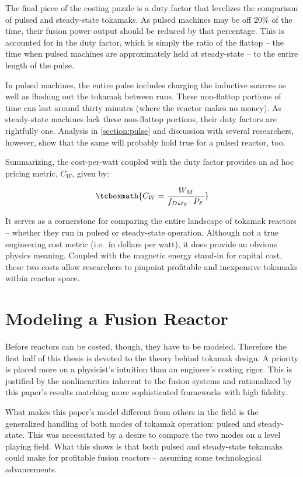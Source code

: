 The final piece of the costing puzzle is a duty factor that levelizes the comparison of pulsed and steady-state tokamaks. As pulsed machines may be off 20\% of the time, their fusion power output should be reduced by that percentage. This is accounted for in the duty factor, which is simply the ratio of the flattop -- the time when pulsed machines are approximately held at steady-state -- to the entire length of the pulse. 

In pulsed machines, the entire pulse includes charging the inductive sources as well as flushing out the tokamak between runs. These non-flattop portions of time can last around thirty minutes (where the reactor makes no money). As steady-state machines lack these non-flattop portions, their duty factors are rightfully one. Analysis in \cref{section:pulse} and discussion with several researchers, however, show that the same will probably hold true for a pulsed reactor, too.

Summarizing, the cost-per-watt coupled with the duty factor provides an ad hoc pricing metric, $C_W$, given by:

\begin{equation}
	\tcboxmath{
	C_W = \frac{W_M}{f_{Duty} \cdot P_F}
	}
\end{equation}

It serves as a cornerstone for comparing the entire landscape of tokamak reactors -- whether they run in pulsed or steady-state operation. Although not a true engineering cost metric (i.e.\ in dollars per watt), it does provide an obvious physics meaning. Coupled with the magnetic energy stand-in for capital cost, these two costs allow researchers to pinpoint profitable and inexpensive tokamaks within reactor space.

\section{Modeling a Fusion Reactor}

Before reactors can be costed, though, they have to be modeled. Therefore the first half of this thesis is devoted to the theory behind tokamak design. A priority is placed more on a physicist's intuition than an engineer's costing rigor. This is justified by the nonlinearities inherent to the fusion systems and rationalized by this paper's results matching more sophisticated frameworks with high fidelity.

What makes this paper's model different from others in the field is the generalized handling of both modes of tokamak operation: pulsed and steady-state. This was necessitated by a desire to compare the two modes on a level playing field. What this shows is that both pulsed and steady-state tokamaks could make for profitable fusion reactors -- assuming some technological advancements.

